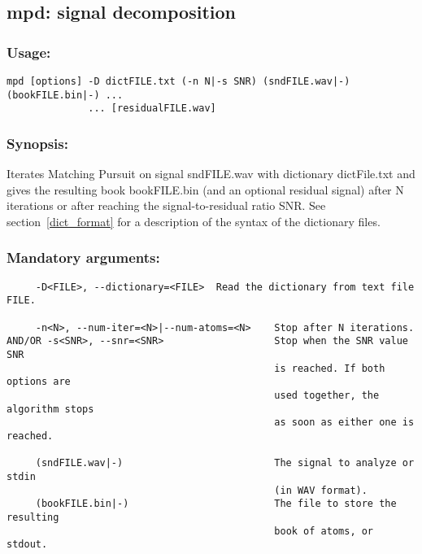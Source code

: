 \documentclass[11pt,a4paper]{article}
\begin{document}
\clearpage
\subsection{mpd: signal decomposition}

\subsubsection*{Usage:}
\begin{verbatim}
mpd [options] -D dictFILE.txt (-n N|-s SNR) (sndFILE.wav|-) (bookFILE.bin|-) ...
              ... [residualFILE.wav]
\end{verbatim}

\subsubsection*{Synopsis:}
Iterates Matching Pursuit on signal sndFILE.wav with dictionary dictFile.txt
and gives the resulting book bookFILE.bin (and an optional residual signal)
after N iterations or after reaching the signal-to-residual ratio SNR.  See
section~\ref{dict_format} for a description of the syntax of the dictionary
files.


\subsubsection*{Mandatory arguments:}
\begin{verbatim}
     -D<FILE>, --dictionary=<FILE>  Read the dictionary from text file FILE.

     -n<N>, --num-iter=<N>|--num-atoms=<N>    Stop after N iterations.
AND/OR -s<SNR>, --snr=<SNR>                   Stop when the SNR value SNR
                                              is reached. If both options are
                                              used together, the algorithm stops
                                              as soon as either one is reached.

     (sndFILE.wav|-)                          The signal to analyze or stdin
                                              (in WAV format).
     (bookFILE.bin|-)                         The file to store the resulting
                                              book of atoms, or stdout.
\end{verbatim}
\end{document}
